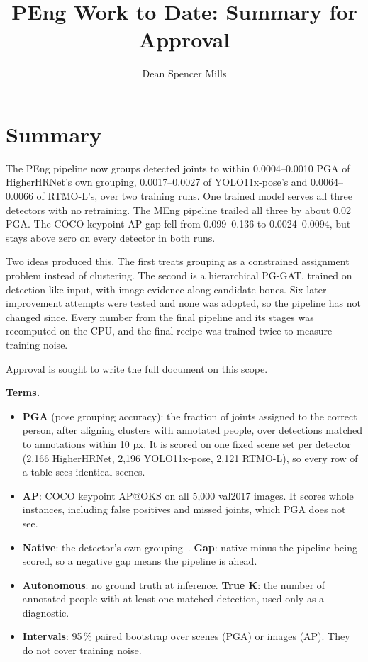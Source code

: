 \documentclass[11pt,a4paper]{article}
\title{PEng Work to Date: Summary for Approval}
\author{Dean Spencer Mills}
\date{}
\begin{document}
\maketitle

\section{Summary}
\label{sec_summary}

The PEng pipeline now groups detected joints to within 0.0004--0.0010 PGA of HigherHRNet's own grouping,
0.0017--0.0027 of YOLO11x-pose's and 0.0064--0.0066 of RTMO-L's, over two training runs.
One trained model serves all three detectors with no retraining.
The MEng pipeline trailed all three by about 0.02 PGA.
The COCO keypoint AP gap fell from 0.099--0.136 to 0.0024--0.0094, but stays above zero on every detector in both runs.

Two ideas produced this.
The first treats grouping as a constrained assignment problem instead of clustering.
The second is a hierarchical PG-GAT, trained on detection-like input, with image evidence along candidate bones.
Six later improvement attempts were tested and none was adopted, so the pipeline has not changed since.
Every number from the final pipeline and its stages was recomputed on the CPU,
and the final recipe was trained twice to measure training noise.

Approval is sought to write the full document on this scope.

\textbf{Terms.}
\begin{itemize}
    \item \textbf{PGA} (pose grouping accuracy): the fraction of joints assigned to the correct person, after aligning
    clusters with annotated people, over detections matched to annotations within 10 px.
    It is scored on one fixed scene set per detector (2,166 HigherHRNet, 2,196 YOLO11x-pose, 2,121 RTMO-L),
    so every row of a table sees identical scenes.
    \item \textbf{AP}: COCO keypoint AP@OKS on all 5,000 val2017 images.
    It scores whole instances, including false positives and missed joints, which PGA does not see.
    \item \textbf{Native}: the detector's own grouping~\citep{cheng2020higherhrnet,ultralytics2024yolo11,lu2024rtmo}.
    \textbf{Gap}: native minus the pipeline being scored, so a negative gap means the pipeline is ahead.
    \item \textbf{Autonomous}: no ground truth at inference.
    \textbf{True K}: the number of annotated people with at least one matched detection, used only as a diagnostic.
    \item \textbf{Intervals}: 95\,\% paired bootstrap over scenes (PGA) or images (AP).
    They do not cover training noise.
\end{itemize}
\end{document}

